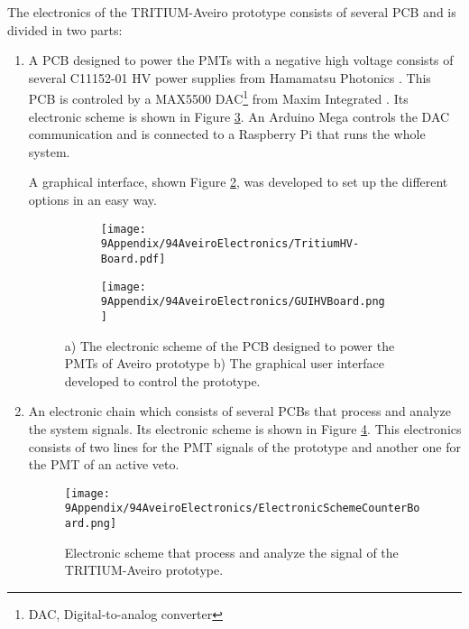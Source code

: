 The electronics of the TRITIUM-Aveiro prototype consists of several PCB and is divided in two parts:
\begin{enumerate}
\item{} A PCB designed to power the PMTs with a negative high voltage consists of several C11152-01  HV power supplies from Hamamatsu Photonics \cite{PowerSupplyAveiroDataSheet}. This PCB is controled by a MAX5500 DAC\footnote{DAC, Digital-to-analog converter} from Maxim Integrated \cite{MAX5500DataSheet}. Its electronic scheme is shown in Figure \ref{fig:HVElectronicAveiro}.  An Arduino Mega controls the DAC communication and is connected to a Raspberry Pi that runs the whole system.

A graphical interface, shown Figure \ref{subfig:GUI}, was developed to set up the different options in an easy way.

\begin{figure}
\centering
    \begin{subfigure}[b]{0.8\textwidth}
    \centering
    \texttt{[image: 9Appendix/94AveiroElectronics/TritiumHV-Board.pdf]}  
    \caption{\label{subfig:ElectronicSchemeHVBoard}}
    \end{subfigure}
    \hfill
    \begin{subfigure}[b]{0.6\textwidth}
    \centering
    \texttt{[image: 9Appendix/94AveiroElectronics/GUIHVBoard.png]}  
    \caption{\label{subfig:GUI}}
    \end{subfigure}
 \caption{a) The electronic scheme of the PCB designed to power the PMTs of Aveiro prototype b) The graphical user interface developed to control the prototype.}
 \label{fig:HVElectronicAveiro}
\end{figure}

\item{} An electronic chain which consists of several PCBs that process and analyze the system signals. Its electronic scheme is shown in Figure \ref{fig:ElectronicSchemCounterBoard}. This electronics consists of two lines for the PMT signals of the prototype and another one for the PMT of an active veto.

\begin{figure}[h]
\centering
\texttt{[image: 9Appendix/94AveiroElectronics/ElectronicSchemeCounterBoard.png]}
\caption{Electronic scheme that process and analyze the signal of the TRITIUM-Aveiro prototype. \label{fig:ElectronicSchemCounterBoard}}
\end{figure}


\end{enumerate}
